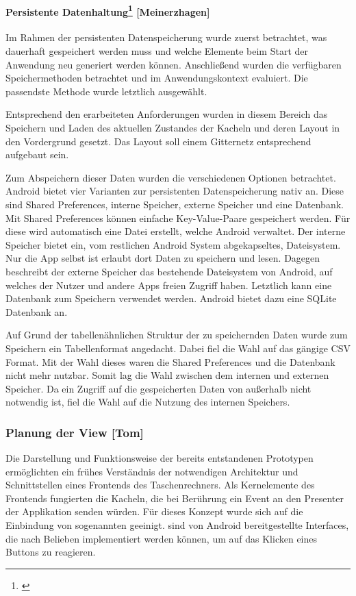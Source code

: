 \paragraph{Persistente Datenhaltung\protect\footnote{\cite[vgl.][]{ogbo2016}} [Meinerzhagen]}

Im Rahmen der persistenten Datenspeicherung wurde zuerst betrachtet, was dauerhaft gespeichert werden muss und welche Elemente beim Start der Anwendung neu generiert werden können. Anschließend wurden die verfügbaren Speichermethoden betrachtet und im Anwendungskontext evaluiert. Die passendste Methode wurde letztlich ausgewählt.

Entsprechend den erarbeiteten Anforderungen wurden in diesem Bereich das Speichern und Laden des aktuellen Zustandes der Kacheln und deren Layout in den Vordergrund gesetzt. Das Layout soll einem Gitternetz entsprechend aufgebaut sein.

Zum Abspeichern dieser Daten wurden die verschiedenen Optionen betrachtet. Android bietet vier Varianten zur persistenten Datenspeicherung nativ an. Diese sind Shared Preferences, interne Speicher, externe Speicher und eine Datenbank. Mit Shared Preferences können einfache Key-Value-Paare gespeichert werden. Für diese wird automatisch eine Datei erstellt, welche Android verwaltet. Der interne Speicher bietet ein, vom restlichen Android System abgekapseltes, Dateisystem. Nur die App selbst ist erlaubt dort Daten zu speichern und lesen. Dagegen beschreibt der externe Speicher das bestehende Dateisystem von Android, auf welches der Nutzer und andere Apps freien Zugriff haben. Letztlich kann eine Datenbank zum Speichern verwendet werden. Android bietet dazu eine SQLite Datenbank an.

Auf Grund der tabellenähnlichen Struktur der zu speichernden Daten wurde zum Speichern ein Tabellenformat angedacht. Dabei fiel die Wahl auf das gängige CSV Format. Mit der Wahl dieses waren die Shared Preferences und die Datenbank nicht mehr nutzbar. Somit lag die Wahl zwischen dem internen und externen Speicher. Da ein Zugriff auf die gespeicherten Daten von außerhalb nicht notwendig ist, fiel die Wahl auf die Nutzung des internen Speichers. 

\clearpage

\subsubsection{Planung der View [Tom]}

Die Darstellung und Funktionsweise der bereits entstandenen Prototypen ermöglichten ein frühes Verständnis der notwendigen Architektur und Schnittstellen eines Frontends des Taschenrechners. Als Kernelemente des Frontends fungierten die Kacheln, die bei Berührung ein Event an den Presenter der Applikation senden würden. Für dieses Konzept wurde sich auf die Einbindung von sogenannten  geeinigt.  sind von Android bereitgestellte Interfaces, die nach Belieben implementiert werden können, um auf das Klicken eines Buttons zu reagieren.

